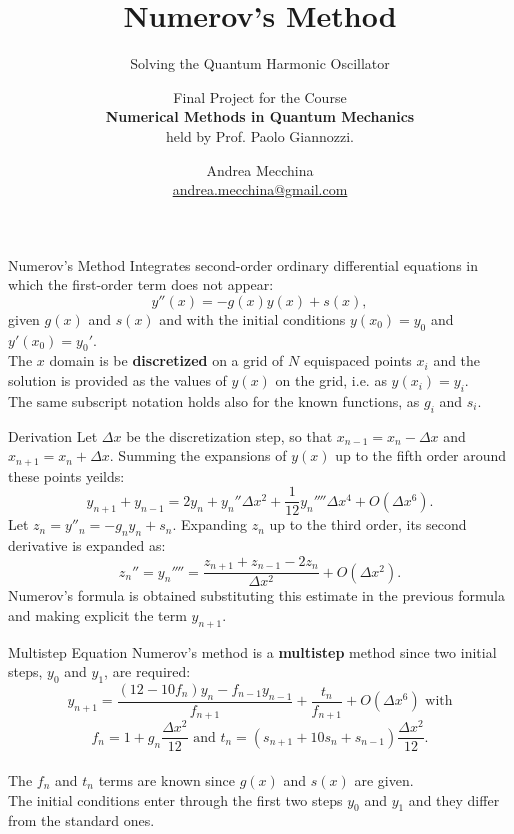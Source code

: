 \documentclass{beamer}
\title{Numerov’s Method}
\subtitle{Solving the Quantum Harmonic Oscillator}
\author[Andrea Mecchina]{Final Project for the Course \\ \textbf{Numerical Methods in Quantum Mechanics} \\ held by Prof. Paolo Giannozzi.}
\date[AY 2020-21]{Andrea Mecchina \\\href{mailto:andrea.mecchina@gmail.com}{andrea.mecchina@gmail.com}}
\institute[]{\normalsize Università degli Studi di Trieste}
\begin{document}
\frame{\titlepage}

\begin{frame}{Numerov's Method}
Integrates second-order ordinary differential equations in which the first-order term does not appear:
$$y''(x)=-g(x)y(x)+s(x),$$
given $g(x)$ and $s(x)$ and with the initial conditions $y(x_0)=y_0$ and $y'(x_0)=y_0'$.\\
\vspace{\baselineskip}
The $x$ domain is be \textbf{discretized} on a grid of $N$ equispaced points $x_i$ and the solution is provided as the values of $y(x)$ on the grid, i.e. as $y(x_i)=y_i$.
\\
\vspace{\baselineskip}
The same subscript notation holds also for the known functions, as $g_i$ and $s_i$.
\end{frame}

\begin{frame}{Derivation}
Let $\Delta x$ be the discretization step, so that $x_{n-1}=x_n-\Delta x$ and $x_{n+1}=x_n+\Delta x$. Summing the expansions of $y(x)$ up to the fifth order around these points yeilds:
$$y_{n+1}+y_{n-1}=2y_n+y_n''\Delta x^2+\frac{1}{12}y_n''''\Delta x^4+O(\Delta x^6).$$
Let $z_n=y''_n=-g_ny_n+s_n$. Expanding $z_n$ up to the third order, its second derivative is expanded as:
$$z_n''=y_n''''=\frac{z_{n+1}+z_{n-1}-2z_n}{\Delta x^2}+O(\Delta x^2).$$
Numerov's formula is obtained substituting this estimate in the previous formula and making explicit the term $y_{n+1}$.
\end{frame}

\begin{frame}{Multistep Equation}
Numerov's method is a \textbf{multistep} method since two initial steps, $y_0$ and $y_1$, are required:
$$y_{n+1}=\frac{(12-10f_n)y_n-f_{n-1}y_{n-1}}{f_{n+1}}+\frac{t_n}{f_{n+1}}+O(\Delta x^6)\text{ with}$$
$$f_n =1+g_n\frac{\Delta x^2}{12}\text{ and }t_n=(s_{n+1}+10s_n+s_{n-1})\frac{\Delta x^2}{12}.$$\\
\vspace{\baselineskip}
The $f_n$ and $t_n$ terms are known since $g(x)$ and $s(x)$ are given.\\
\vspace{\baselineskip}
The initial conditions enter through the first two steps $y_0$ and $y_1$ and they differ from the standard ones.
\end{frame}
\end{document}

